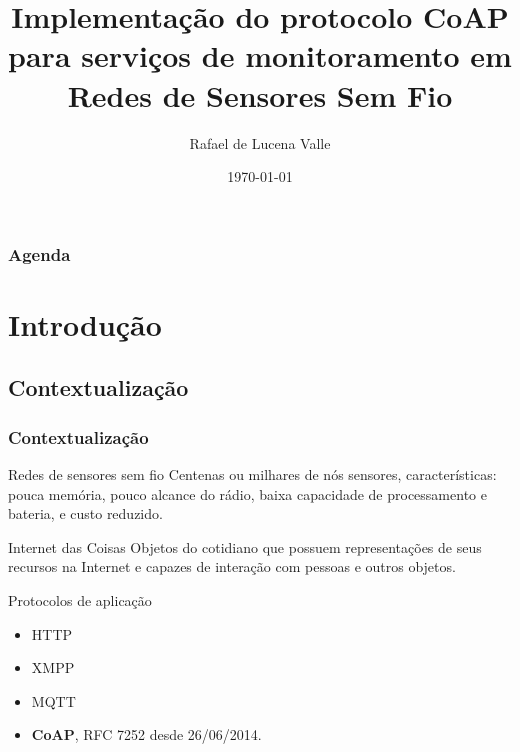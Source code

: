 \documentclass{beamer}
\title[CoAP]{Implementa\c{c}\~ao do protocolo CoAP para servi\c{c}os de monitoramento em Redes de Sensores Sem Fio} %
\author{Rafael de Lucena Valle} %
\institute[UFSC] %
{
Universidade Federal de Santa Catarina \\ %
\medskip
\textit{rafaeldelucena@inf.ufsc.br} %
}
\date{\today} %
\begin{document}
\begin{frame}
\titlepage %
\end{frame}

\begin{frame}
\frametitle{Agenda} %
\tableofcontents %
\end{frame}


\section{Introdu\c{c}\~ao} %

\subsection{Contextualização}
\begin{frame}
\frametitle{Contextualização}

\begin{block}{Redes de sensores sem fio}
Centenas ou milhares de n\'os sensores, caracter\'isticas: pouca mem\'oria, pouco alcance do r\'adio, baixa capacidade de processamento e bateria, e custo reduzido.
\end{block}

\begin{block}{Internet das Coisas}
Objetos do cotidiano que possuem representações de seus recursos na Internet e capazes de interação com pessoas e outros objetos.
\end{block}

\begin{block}{Protocolos de aplicação}
    \begin{itemize}
        \item HTTP
        \item XMPP 
        \item MQTT
        \item \textbf{CoAP}, RFC 7252 desde 26/06/2014.
    \end{itemize}
\end{block}
\end{frame}
\end{document}
